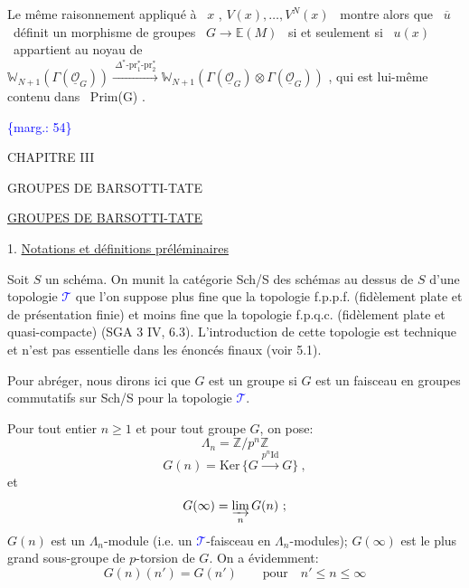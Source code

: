 \documentclass[11pt]{article}
\newcommand{\scanpage}[1]{\par\bigskip\noindent{\small\sffamily[scan #1]}\par}
\newcommand{\mspage}[1]{{\small\sffamily[p.\,#1]}}
\newcommand{\hand}[1]{\textcolor{blue}{#1}}
\newcommand{\margin}[1]{\textcolor{blue}{\{\textsf{marg.:} #1\}}}
\newcommand{\uline}[1]{\underline{#1}}
\begin{document}
Le même raisonnement appliqué à \ $x$ , $V(x),\dots,V^N(x)$ \ montre
alors que \ $\overline{u}$ \ définit un morphisme de groupes \ $G \to \mathbb{E}(M)$ \ si et seulement
si \ $u(x)$ \ appartient au noyau de \ $\mathbb{W}_{N+1}(\Gamma(\underline{\mathcal{O}}_G)) \xrightarrow{\ \Delta^*\text{-}\mathrm{pr}_1^*\text{-}\mathrm{pr}_2^*\ } \mathbb{W}_{N+1}(\Gamma(\underline{\mathcal{O}}_G) \otimes \Gamma(\underline{\mathcal{O}}_G))$ ,
qui est lui-même contenu dans \ Prim(G) .

\margin{54}

\clearpage
\scanpage{129/55}
CHAPITRE III

GROUPES DE BARSOTTI-TATE

\mspage{\hand{55}}

\clearpage
\scanpage{129/56}
\mspage{\hand{III-1}}

\uline{GROUPES DE BARSOTTI-TATE}

1. \uline{Notations et définitions préléminaires}

Soit $S$ un schéma. On munit la catégorie Sch/S des schémas
au dessus de $S$ d'une topologie \hand{$\mathcal{T}$} que l'on suppose plus fine que la
topologie f.p.p.f. (fidèlement plate et de présentation finie) et moins
fine que la topologie f.p.q.c. (fidèlement plate et quasi-compacte)
(SGA 3 IV, 6.3). L'introduction de cette topologie est technique et n'est
pas essentielle dans les énoncés finaux (voir 5.1).

Pour abréger, nous dirons ici que $G$ est un groupe si $G$ est
un faisceau en groupes commutatifs sur Sch/S pour la topologie \hand{$\mathcal{T}$}.

Pour tout entier $n \geq 1$ et pour tout groupe $G$, on pose:
\[ \Lambda_n = \mathbb{Z}/p^n\mathbb{Z} \]
\[ G(n) = \mathrm{Ker}\,\{G \xrightarrow{p^n \mathrm{Id}} G\} \ , \]
et
\[ G(\infty) = \varinjlim_{n} G(n) \ ; \]
$G(n)$ est un $\Lambda_n$-module (i.e. un \hand{$\mathcal{T}$}-faisceau en $\Lambda_n$-modules);
$G(\infty)$ est le plus grand sous-groupe de $p$-torsion de $G$. On a évidemment:
\[ G(n)(n') = G(n') \qquad \text{pour} \quad n' \leq n \leq \infty \]
\end{document}
